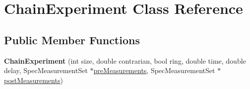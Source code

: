 \hypertarget{class_chain_experiment}{\section{Chain\-Experiment Class Reference}
\label{class_chain_experiment}
}
\subsection*{Public Member Functions}
\begin{DoxyCompactItemize}
\item 
\hypertarget{class_chain_experiment_a0abdddd54c8d25e68b9e372b10c818b4}{{\bfseries Chain\-Experiment} (int size, double contrarian, bool ring, double time, double delay, Spec\-Measurement\-Set $\ast$\hyperlink{class_chain_experiment_adbc54d1d7cd2d86f838b0128e5597216}{pre\-Measurements}, Spec\-Measurement\-Set $\ast$\hyperlink{class_chain_experiment_a9362d54e02df4c8dd2a461b7aa4e322a}{post\-Measurements})}\label{class_chain_experiment_a0abdddd54c8d25e68b9e372b10c818b4}

\end{DoxyCompactItemize}
